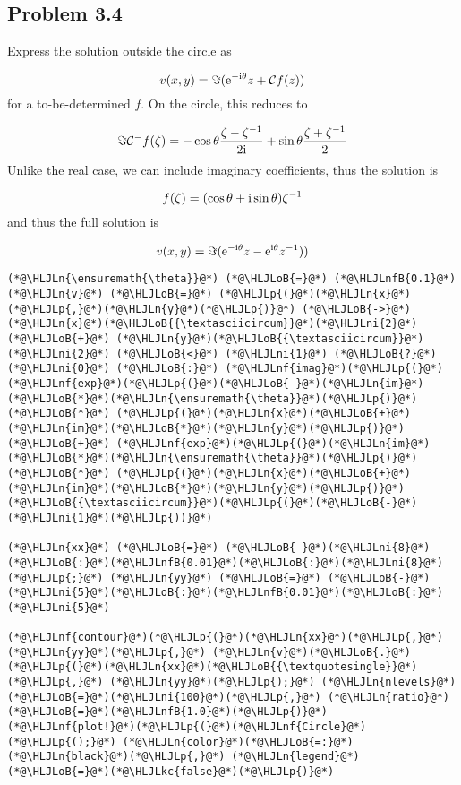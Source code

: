 \documentclass[12pt,landscape]{article}
\newcommand{\HLJLkc}[1]{\textcolor[RGB]{59,151,46}{\textit{#1}}}
\newcommand{\HLJLn}[1]{#1}
\newcommand{\HLJLnf}[1]{\textcolor[RGB]{66,102,213}{#1}}
\newcommand{\HLJLnfB}[1]{\textcolor[RGB]{59,151,46}{#1}}
\newcommand{\HLJLni}[1]{\textcolor[RGB]{59,151,46}{#1}}
\newcommand{\HLJLoB}[1]{\textcolor[RGB]{102,102,102}{\textbf{#1}}}
\newcommand{\HLJLp}[1]{#1}
\def\I{ {\rm i} }
\def\E{ {\rm e} }
\def\CC{ {\cal C} }
\begin{document}
{\subsection{Problem 3.4}
Express the solution outside the circle as

\[
v(x,y) = \Im ( \E^{-\I \theta} z + \CC f(z))
\]
for a to-be-determined $f$. On the circle, this reduces to

\[
\Im \CC^- f(\zeta) = -\cos \theta {\zeta - \zeta^{-1} \over 2 \I}  + \sin \theta {\zeta + \zeta^{-1} \over 2}
\]
Unlike the real case, we can include imaginary coefficients, thus the solution is

\[
f(\zeta) = (\cos \theta + \I \sin \theta) \zeta^{-1}
\]
and thus the full solution is

\[
v(x,y) =  \Im ( \E^{-\I \theta} z - \E^{\I \theta}   z^{-1}))
\]

\begin{lstlisting}
(*@\HLJLn{\ensuremath{\theta}}@*) (*@\HLJLoB{=}@*) (*@\HLJLnfB{0.1}@*)
(*@\HLJLn{v}@*) (*@\HLJLoB{=}@*) (*@\HLJLp{(}@*)(*@\HLJLn{x}@*)(*@\HLJLp{,}@*)(*@\HLJLn{y}@*)(*@\HLJLp{)}@*) (*@\HLJLoB{->}@*) (*@\HLJLn{x}@*)(*@\HLJLoB{{\textasciicircum}}@*)(*@\HLJLni{2}@*) (*@\HLJLoB{+}@*) (*@\HLJLn{y}@*)(*@\HLJLoB{{\textasciicircum}}@*)(*@\HLJLni{2}@*) (*@\HLJLoB{<}@*) (*@\HLJLni{1}@*) (*@\HLJLoB{?}@*) (*@\HLJLni{0}@*) (*@\HLJLoB{:}@*) (*@\HLJLnf{imag}@*)(*@\HLJLp{(}@*)(*@\HLJLnf{exp}@*)(*@\HLJLp{(}@*)(*@\HLJLoB{-}@*)(*@\HLJLn{im}@*)(*@\HLJLoB{*}@*)(*@\HLJLn{\ensuremath{\theta}}@*)(*@\HLJLp{)}@*) (*@\HLJLoB{*}@*) (*@\HLJLp{(}@*)(*@\HLJLn{x}@*)(*@\HLJLoB{+}@*)(*@\HLJLn{im}@*)(*@\HLJLoB{*}@*)(*@\HLJLn{y}@*)(*@\HLJLp{)}@*) (*@\HLJLoB{+}@*) (*@\HLJLnf{exp}@*)(*@\HLJLp{(}@*)(*@\HLJLn{im}@*)(*@\HLJLoB{*}@*)(*@\HLJLn{\ensuremath{\theta}}@*)(*@\HLJLp{)}@*) (*@\HLJLoB{*}@*) (*@\HLJLp{(}@*)(*@\HLJLn{x}@*)(*@\HLJLoB{+}@*)(*@\HLJLn{im}@*)(*@\HLJLoB{*}@*)(*@\HLJLn{y}@*)(*@\HLJLp{)}@*)(*@\HLJLoB{{\textasciicircum}}@*)(*@\HLJLp{(}@*)(*@\HLJLoB{-}@*)(*@\HLJLni{1}@*)(*@\HLJLp{))}@*)

(*@\HLJLn{xx}@*) (*@\HLJLoB{=}@*) (*@\HLJLoB{-}@*)(*@\HLJLni{8}@*)(*@\HLJLoB{:}@*)(*@\HLJLnfB{0.01}@*)(*@\HLJLoB{:}@*)(*@\HLJLni{8}@*)(*@\HLJLp{;}@*) (*@\HLJLn{yy}@*) (*@\HLJLoB{=}@*) (*@\HLJLoB{-}@*)(*@\HLJLni{5}@*)(*@\HLJLoB{:}@*)(*@\HLJLnfB{0.01}@*)(*@\HLJLoB{:}@*)(*@\HLJLni{5}@*)

(*@\HLJLnf{contour}@*)(*@\HLJLp{(}@*)(*@\HLJLn{xx}@*)(*@\HLJLp{,}@*) (*@\HLJLn{yy}@*)(*@\HLJLp{,}@*) (*@\HLJLn{v}@*)(*@\HLJLoB{.}@*)(*@\HLJLp{(}@*)(*@\HLJLn{xx}@*)(*@\HLJLoB{{\textquotesingle}}@*)(*@\HLJLp{,}@*) (*@\HLJLn{yy}@*)(*@\HLJLp{);}@*) (*@\HLJLn{nlevels}@*)(*@\HLJLoB{=}@*)(*@\HLJLni{100}@*)(*@\HLJLp{,}@*) (*@\HLJLn{ratio}@*)(*@\HLJLoB{=}@*)(*@\HLJLnfB{1.0}@*)(*@\HLJLp{)}@*)
(*@\HLJLnf{plot!}@*)(*@\HLJLp{(}@*)(*@\HLJLnf{Circle}@*)(*@\HLJLp{();}@*) (*@\HLJLn{color}@*)(*@\HLJLoB{=:}@*)(*@\HLJLn{black}@*)(*@\HLJLp{,}@*) (*@\HLJLn{legend}@*)(*@\HLJLoB{=}@*)(*@\HLJLkc{false}@*)(*@\HLJLp{)}@*)
\end{lstlisting}

}
\end{document}
